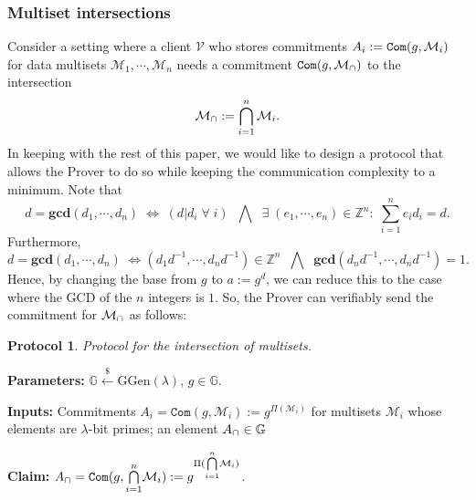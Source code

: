 \documentclass[11pt, lettersize, notitlepage, leqno, footskip=0.6cm]{article}
\newcommand{\bz}{\mathbb Z}
\newcommand{\slim}{\sum\limits}
\newcommand{\ttt}{\texttt}
\newcommand{\LRA}{\Longleftrightarrow}
\newcommand{\mc}{\mathcal}
\newcommand{\mb}{\mathbb}
\newcommand{\mbf}{\mathbf}
\newcommand{\mr}{\mathrm}
\newcommand{\lam}{\lambda}
\newcommand{\lamb}{\lambda}
\newcommand{\mcM}{\mc{M}}
\newcommand{\vs}{\vspace{-0.15cm}}
\newcommand{\noin}{\noindent}
\newcommand{\GCD}{\mbf{gcd}}
\newtheorem{Prot}[Thm]{Protocol}
\numberwithin{equation}{section}
\begin{document}
\subsubsection{\fontsize{11}{11}\selectfont Multiset intersections }

\noin Consider a setting where a client $\mc{V}$ who stores commitments $A_i:= \protect{\ttt{Com}}(g, \mc{M}_i)$ for data multisets $\mc{M}_1, \cdots, \mc{M}_n$ needs a commitment $\protect{\verb|Com|}(g, \mc{M}_{\tt{\cap}})$ to the intersection \vs $$\mc{M}_{\tt{\cap}}:=\bigcap\limits_{i=1}^n \mc{M}_i .$$ In keeping with the rest of this paper, we would like to design a protocol that allows the Prover to do so while keeping the communication complexity to a minimum. Note that \vs $$d = \GCD(d_1,\cdots,d_n)\; \LRA\; (d|d_i\;\forall\;i)\;\;\bigwedge\;\; \exists\;(e_1,\cdots,e_n)\in\bz^n:\;\slim_{i=1}^n e_id_i = d .$$\vs Furthermore, \vs $$d = \GCD(d_1,\cdots,d_n)\; \LRA \left({d_1}{d}^{-1},\cdots, {d_n}{d}^{-1}\right)\in \bz^n\;\;\bigwedge\;\; \GCD\left({d_n}{d}^{-1},\cdots, {d_n}{d}^{-1}\right)=1.$$ Hence, by changing the base from $g$ to $a:= g^d$, we can reduce this to the case where the GCD of the $n$ integers is $1$. So, the Prover can verifiably send the commitment for $\mc{M}_{\tt{\cap}}$ as follows: \vspace{0.1cm}


\begin{Prot} Protocol for the intersection of multisets.\end{Prot} \vspace{-0.3cm}

\noin \textbf{Parameters:} $\mb{G}\xleftarrow{\$} \mr{GGen}(\lamb)$,\; $g\in \mb{G}$.

\noin \textbf{Inputs:} Commitments $A_i = \ttt{Com}(g, \mcM_i) := g^{\Pi(\mc{M}_i)}$ for multisets $\mc{M}_i$ whose elements are $\lam$-bit primes; an element $A_{\tt{\cap}}\in\mb{G}$

\noin \textbf{Claim:} $A_{\tt{\cap}} = \protect{\verb|Com|}(g, {\bigcap\limits_{i=1}^n} \mc{M}_i) := g^{\Pi({\bigcap\limits_{i=1}^n} \mc{M}_i)}$.
\end{document}
